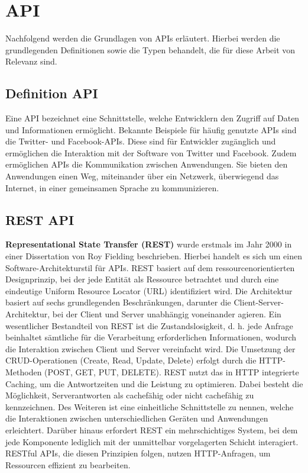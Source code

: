 
\section{API} %
\label{sec:apigrundlagen}
Nachfolgend werden die Grundlagen von APIs erläutert. Hierbei werden die grundlegenden Definitionen sowie die Typen behandelt, die für diese Arbeit von Relevanz sind.
\subsection{Definition API} %
\label{sec:grundlegendedefinitionvonapi}
Eine API bezeichnet eine Schnittstelle, welche Entwicklern den Zugriff auf Daten und Informationen ermöglicht. Bekannte Beispiele für häufig genutzte APIs sind die Twitter- und Facebook-APIs. Diese sind für Entwickler zugänglich und ermöglichen die Interaktion mit der Software von Twitter und Facebook. Zudem ermöglichen APIs die Kommunikation zwischen Anwendungen. Sie bieten den Anwendungen einen Weg, miteinander über ein Netzwerk, überwiegend das Internet, in einer gemeinsamen Sprache zu kommunizieren. \citep{apistrategyguide}
\newpage
\subsection{REST API} %
\label{sec:restapi}
 \textbf{Representational State Transfer (REST)} wurde erstmals im Jahr 2000 in einer Dissertation von Roy Fielding beschrieben. Hierbei handelt es sich um einen Software-Architekturstil für APIs. REST basiert auf dem ressourcenorientierten Designprinzip, bei der jede Entität als Ressource betrachtet und durch eine eindeutige Uniform Resource Locator (URL) identifiziert wird. Die Architektur basiert auf sechs grundlegenden Beschränkungen, darunter die Client-Server-Architektur, bei der Client und Server unabhängig voneinander agieren. Ein wesentlicher Bestandteil von REST ist die Zustandslosigkeit, d. h. jede Anfrage beinhaltet sämtliche für die Verarbeitung erforderlichen Informationen, wodurch die Interaktion zwischen Client und Server vereinfacht wird. Die Umsetzung der CRUD-Operationen (Create, Read, Update, Delete) erfolgt durch die HTTP-Methoden (POST, GET, PUT, DELETE). REST nutzt das in HTTP integrierte Caching, um die Antwortzeiten und die Leistung zu optimieren. Dabei besteht die Möglichkeit, Serverantworten als cachefähig oder nicht cachefähig zu kennzeichnen. Des Weiteren ist eine einheitliche Schnittstelle zu nennen, welche die Interaktionen zwischen unterschiedlichen Geräten und Anwendungen erleichtert. Darüber hinaus erfordert REST ein mehrschichtiges System, bei dem jede Komponente lediglich mit der unmittelbar vorgelagerten Schicht interagiert. RESTful APIs, die diesen Prinzipien folgen, nutzen HTTP-Anfragen, um Ressourcen effizient zu bearbeiten. \citep{Fielding2000}  \citep{graphqlreplacerest}

